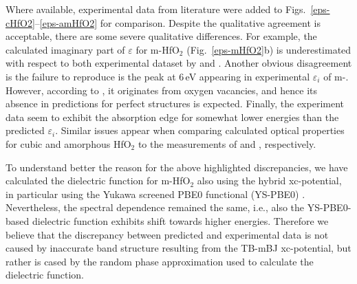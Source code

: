 \documentclass[10pt,a4paper,twocolumn]{article}
\begin{document}
Where available, experimental data from literature were added to Figs.~\ref{eps-cHfO2}--\ref{eps-amHfO2} for comparison. 
Despite the qualitative agreement is acceptable, there are some severe qualitative differences.
For example, the calculated imaginary part of $\varepsilon$ for m-HfO$_2$ (Fig.~\ref{eps-mHfO2}b) is underestimated with respect to both experimental dataset by \citet{Edwards2003} and \citet{Nguyen2005}.
Another obvious disagreement is the failure to reproduce is the peak at 6\,eV appearing in experimental $\varepsilon_i$ of m-.
However, according to \citet{Takeuchi2004}, it originates from oxygen vacancies, and hence its absence in predictions for perfect structures is expected.
Finally, the experiment data seem to exhibit the absorption edge for somewhat lower energies than the predicted $\varepsilon_i$.
Similar issues appear when comparing calculated optical properties for cubic and amorphous HfO$_2$ to the measurements of \citet{Lim2002} and \citet{Nguyen2005}, respectively.

To understand better the reason for the above highlighted discrepancies, we have calculated the dielectric function for m-HfO$_2$ also using the hybrid xc-potential, in particular using the Yukawa screened PBE0 functional (YS-PBE0) \cite{Tran2011}.
Nevertheless, the spectral dependence remained the same, i.e., also the YS-PBE0-based dielectric function exhibits shift towards higher energies.
Therefore we believe that the discrepancy between predicted and experimental data is not caused by inaccurate band structure resulting from the TB-mBJ xc-potential, but rather is cased by the random phase approximation used to calculate the dielectric function.


\end{document}
